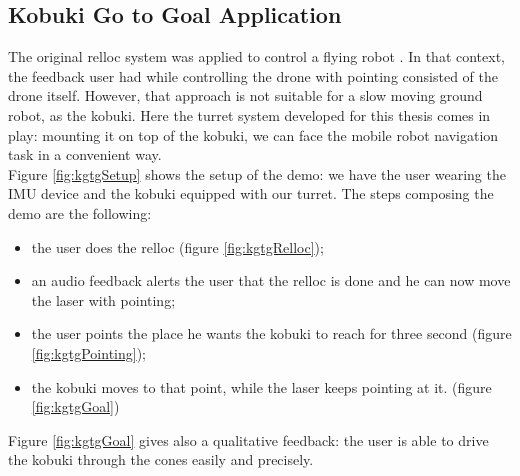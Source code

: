 \subsection{Kobuki Go to Goal Application}
The original relloc system was applied to control a flying robot \cite{gromov2018robot}. In that context, the feedback user had while controlling the drone with pointing consisted of the drone itself. However, that approach is not suitable for a slow moving ground robot, as the kobuki. Here the turret system developed for this thesis comes in play: mounting it on top of the kobuki, we can face the mobile robot navigation task in a convenient way.\\
Figure \ref{fig:kgtgSetup} shows the setup of the demo: we have the user wearing the IMU device and the kobuki equipped with our turret. The steps composing the demo are the following:
\begin{itemize}
    \item the user does the relloc (figure \ref{fig:kgtgRelloc});
    \item an audio feedback alerts the user that the relloc is done and he can now move the laser with pointing;
    \item the user points the place he wants the kobuki to reach for three second (figure \ref{fig:kgtgPointing});
    \item the kobuki moves to that point, while the laser keeps pointing at it. (figure \ref{fig:kgtgGoal})
\end{itemize}
Figure \ref{fig:kgtgGoal} gives also a qualitative feedback: the user is able to drive the kobuki through the cones easily and precisely.
